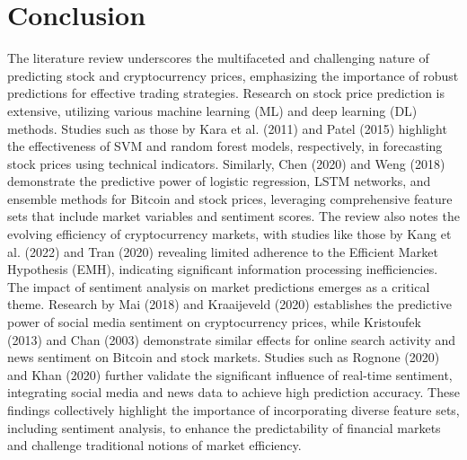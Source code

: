 \section{Conclusion}
The literature review underscores the multifaceted and challenging nature of predicting stock and cryptocurrency prices, emphasizing the importance of robust predictions for effective trading strategies. Research on stock price prediction is extensive, utilizing various machine learning (ML) and deep learning (DL) methods. Studies such as those by Kara et al. (2011) and Patel (2015) highlight the effectiveness of SVM and random forest models, respectively, in forecasting stock prices using technical indicators. Similarly, Chen (2020) and Weng (2018) demonstrate the predictive power of logistic regression, LSTM networks, and ensemble methods for Bitcoin and stock prices, leveraging comprehensive feature sets that include market variables and sentiment scores. The review also notes the evolving efficiency of cryptocurrency markets, with studies like those by Kang et al. (2022) and Tran (2020) revealing limited adherence to the Efficient Market Hypothesis (EMH), indicating significant information processing inefficiencies.
The impact of sentiment analysis on market predictions emerges as a critical theme. Research by Mai (2018) and Kraaijeveld (2020) establishes the predictive power of social media sentiment on cryptocurrency prices, while Kristoufek (2013) and Chan (2003) demonstrate similar effects for online search activity and news sentiment on Bitcoin and stock markets. Studies such as Rognone (2020) and Khan (2020) further validate the significant influence of real-time sentiment, integrating social media and news data to achieve high prediction accuracy. These findings collectively highlight the importance of incorporating diverse feature sets, including sentiment analysis, to enhance the predictability of financial markets and challenge traditional notions of market efficiency.
